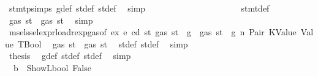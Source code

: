 \begin{isabellebody}
\ stmt{\isachardot}{\kern0pt}psimps{\isacharparenleft}{\kern0pt}{}{\isacharparenright}{\kern0pt}\ g{\isacharunderscore}{\kern0pt}def\ st{\isacharprime}{\kern0pt}{\isacharunderscore}{\kern0pt}def\ st{\isacharprime}{\kern0pt}{\isacharprime}{\kern0pt}{\isacharunderscore}{\kern0pt}def\ \isamarkupfalse%
\ simp\isanewline
\ \ \ \ \ \ \ \ \ \ \ \ \ \ \ \ \ \ \ \ \isamarkupfalse%
\ stmt{\isacharunderscore}{\kern0pt}def\ \isamarkupfalse%
\ {\isachardoublequoteopen}gas\ st{}{\isacharprime}{\kern0pt}\ {\isasymle}\ gas\ st{\isacharprime}{\kern0pt}{\isacharprime}{\kern0pt}{\isachardoublequoteclose}\ \isamarkupfalse%
\ simp\isanewline
\ \ \ \ \ \ \ \ \ \ \ \ \ \ \ \ \ \ \ \ \isamarkupfalse%
\ \isamarkupfalse%
\ msel{\isacharunderscore}{\kern0pt}ssel{\isacharunderscore}{\kern0pt}expr{\isacharunderscore}{\kern0pt}load{\isacharunderscore}{\kern0pt}rexp{\isacharunderscore}{\kern0pt}gas{\isacharparenleft}{\kern0pt}{}{\isacharparenright}{\kern0pt}{\isacharbrackleft}{\kern0pt}of\ ex\ e\ cd\ st{\isacharprime}{\kern0pt}\ {\isachardoublequoteopen}gas\ st\ {\isacharminus}{\kern0pt}\ g{\isachardoublequoteclose}{\isacharbrackright}{\kern0pt}\ {\isacharbackquoteopen}{\isasymnot}\ gas\ st\ {\isasymle}\ g{\isacharbackquoteclose}\ n\ Pair\ KValue\ Value\ TBool\ \isamarkupfalse%
\ {\isachardoublequoteopen}gas\ st{\isacharprime}{\kern0pt}{\isacharprime}{\kern0pt}\ {\isasymle}\ gas\ st{\isacharprime}{\kern0pt}{\isachardoublequoteclose}\ \isamarkupfalse%
\ st{\isacharprime}{\kern0pt}{\isacharunderscore}{\kern0pt}def\ st{\isacharprime}{\kern0pt}{\isacharprime}{\kern0pt}{\isacharunderscore}{\kern0pt}def\ \isamarkupfalse%
\ simp\isanewline
\ \ \ \ \ \ \ \ \ \ \ \ \ \ \ \ \ \ \ \ \isamarkupfalse%
\ \isamarkupfalse%
\ {\isacharquery}{\kern0pt}thesis\ \isamarkupfalse%
\ g{\isacharunderscore}{\kern0pt}def\ st{\isacharprime}{\kern0pt}{\isacharunderscore}{\kern0pt}def\ st{\isacharprime}{\kern0pt}{\isacharprime}{\kern0pt}{\isacharunderscore}{\kern0pt}def\ \isamarkupfalse%
\ simp\isanewline
\ \ \ \ \ \ \ \ \ \ \ \ \ \ \ \ \ \ \isamarkupfalse%
\isanewline
\ \ \ \ \ \ \ \ \ \ \ \ \ \ \ \ \ \ \ \ \isamarkupfalse%
\ {\isachardoublequoteopen}{\isasymnot}\ b\ {\isacharequal}{\kern0pt}\ ShowL\isactrlsub b\isactrlsub o\isactrlsub o\isactrlsub l\ False{\isachardoublequoteclose}\isanewline
\ \ \ \ \ \ \ \ \ \ \ \ \ \ \ \ \ \ \ \ \isamarkupfalse%

\end{isabellebody}
